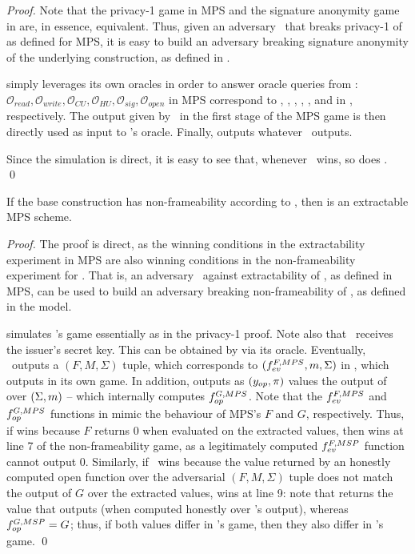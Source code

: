\begin{proof}  
  Note that the privacy-1 game in MPS and the signature anonymity game in \UAS
  are, in essence, equivalent. Thus, given an adversary \adv~that breaks
  privacy-1 of \CUASMPS as defined for MPS, it is easy to build an adversary
  \advB breaking signature anonymity of the underlying \CUASGen construction, as
  defined in \UAS.

  \advB simply leverages its own oracles in order to answer oracle queries from
  \adv: $\mathcal{O}_{read},\mathcal{O}_{write},\mathcal{O}_{CU},\mathcal{O}_{HU},
  \mathcal{O}_{sig},\mathcal{O}_{open}$ in MPS correspond to \RREG, \WREG,
  \CUGEN, \HUGEN, \OBTAIN, \SIGN and \OPEN in \UAS, respectively. The output
  given by \adv~in the first stage of the MPS game is then directly used as
  input to \advB's \CHALb oracle. Finally, \advB outputs whatever \adv~outputs.

  Since the simulation is direct, it is easy to see that, whenever \adv~wins,
  so does \advB.
  \qed
\end{proof}

\begin{theorem}
  If the base \CUASGen construction has non-frameability according to
  , then \CUASMPS is an extractable MPS scheme.
\end{theorem}

\begin{proof}  
  The proof is direct, as the winning conditions in the extractability
  experiment in MPS are also winning conditions in the non-frameability
  experiment for \UAS. That is, an adversary \adv~against extractability of
  \CUASMPS, as defined in MPS, can be used to build an adversary \advB breaking
  non-frameability of \CUASGen, as defined in the \UAS model.

  \advB simulates \adv's game essentially as in the privacy-1 proof. Note also
  that \adv~receives the issuer's secret key. This can be obtained by \advB via
  its \ICORR oracle. Eventually, \adv~outputs a $(F,M,\Sigma)$ tuple, which
  corresponds to $(f_{ev}^{F,MPS},m,\Sigma)$ in \CUASGen,
  which \advB outputs in its own game. In addition, \advB outputs as $(y_{op},
  \pi)$ values the output of \Open over $(\Sigma,m)$ -- which internally
  computes $f_{op}^{G,MPS}$.
  Note that the $f_{ev}^{F,MPS}$ and $f_{op}^{G,MPS}$ functions in \CUASMPS
  mimic the behaviour of MPS's $F$ and $G$, respectively. Thus, if \adv wins
  because $F$ returns $0$ when evaluated on the extracted values, then \advB
  wins at line 7 of the non-frameability game, as a legitimately computed
  $f_{ev}^{F,MSP}$ function cannot output $0$. Similarly, if \adv~wins because
  the value returned by an honestly computed open function over the adversarial
  $(F,M,\Sigma)$ tuple does not match the output of $G$ over the extracted
  values, \advB wins at line 9: note that \advB returns the \yinsp value that
  \Open outputs (when computed honestly over \adv's output), whereas
  $f_{op}^{G,MSP}=G$; thus, if both values differ in \adv's game, then they also
  differ in \advB's game.
  \qed
\end{proof}


